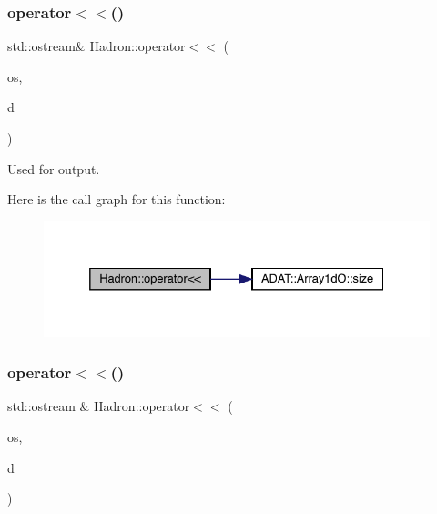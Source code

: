 \subsubsection{\texorpdfstring{operator$<$$<$()}{operator<<()}\hspace{0.1cm}{\footnotesize\ttfamily [27/48]}}
{\footnotesize\ttfamily std\+::ostream\& Hadron\+::operator$<$$<$ (\begin{DoxyParamCaption}\item[{std\+::ostream \&}]{os,  }\item[{const \mbox{\hyperlink{classADAT_1_1Array1dO}{Array1dO}}$<$ \mbox{\hyperlink{structHadron_1_1KeyHadronNPartIrrepOp__t_1_1CGPair__t}{Key\+Hadron\+N\+Part\+Irrep\+Op\+\_\+t\+::\+C\+G\+Pair\+\_\+t}} $>$ \&}]{d }\end{DoxyParamCaption})}



Used for output. 

Here is the call graph for this function\+:\nopagebreak
\begin{figure}[H]
\begin{center}
\leavevmode
\includegraphics[width=332pt]{d1/daf/namespaceHadron_a3dd51258353773598e3f2a8a3252816f_cgraph}
\end{center}
\end{figure}
\mbox{\label{namespaceHadron_a24d0db7f972f8d517641ad9235bfa33c}} 
\subsubsection{\texorpdfstring{operator$<$$<$()}{operator<<()}\hspace{0.1cm}{\footnotesize\ttfamily [28/48]}}
{\footnotesize\ttfamily std\+::ostream \& Hadron\+::operator$<$$<$ (\begin{DoxyParamCaption}\item[{std\+::ostream \&}]{os,  }\item[{const \mbox{\hyperlink{structHadron_1_1KeyMesonElementalOperator__t}{Key\+Meson\+Elemental\+Operator\+\_\+t}} \&}]{d }\end{DoxyParamCaption})}




